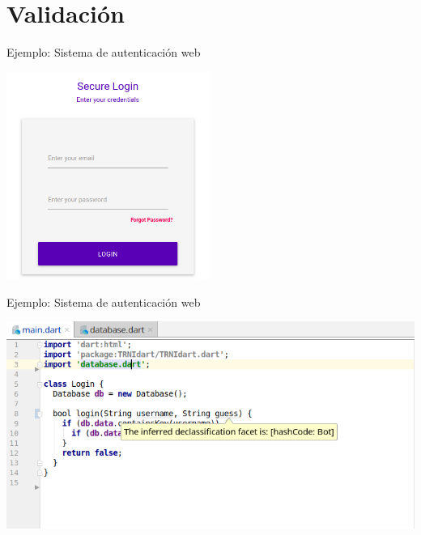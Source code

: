 \documentclass[aspectratio=169,10pt]{beamer}
\begin{document}
\section{Validación}

\begin{frame}[fragile]{Ejemplo: Sistema de autenticación web}
	\begin{center}
		\includegraphics[width=0.5\textwidth]{images/screen4.png}
	\end{center}
\end{frame}
%
%

\begin{frame}[fragile]{Ejemplo: Sistema de autenticación web}
	\begin{center}
		\includegraphics[width=1.0\textwidth]{images/login2.png}
	\end{center}
\end{frame}
\end{document}
